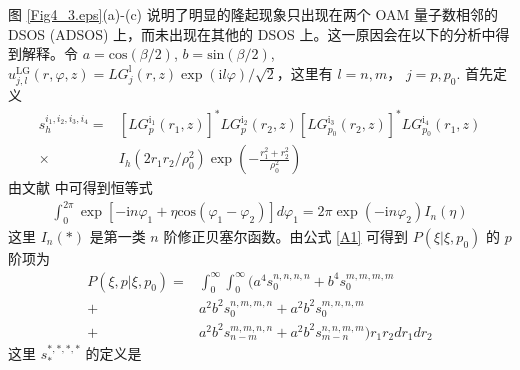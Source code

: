 \documentclass[master]{thesis-uestc}
\begin{document}
图 \ref{Fig4_3.eps}(a)-(c) 说明了明显的隆起现象只出现在两个 OAM 量子数相邻的 DSOS (ADSOS) 上，而未出现在其他的 DSOS 上。这一原因会在以下的分析中得到解释。令 $a=\mathrm{cos}\left(\beta/2\right)$, $b=\mathrm{sin}\left(\beta/2\right)$, $u_{j,l}^\mathrm{LG}(r,\varphi,z)=LG_{j}^\mathrm{l}(r,z)\exp{(\mathrm{i}l\varphi)/\sqrt{2}}$，这里有 $l=n,m$， $j=p,p_0$. 首先定义
\begin{equation}
  \begin{split}
s^{i_{1},i_{2},i_{3},i_{4}}_{h}=&\left[LG_{p}^\mathrm{i_{1}}(r_{1},z)\right]^{\ast}LG_{p}^\mathrm{i_{2}}(r_{2},z)\left[LG_{p_0}^\mathrm{i_{3}}(r_{2},z)\right]^{\ast}LG_{p_0}^\mathrm{i_{4}}(r_{1},z)\\
      \times &I_{h}\left(2r_{1}r_{2}/\rho^2_0\right)\exp\left(-\frac{r_{1}^2+r_{2}^2}{\rho^2_0}\right)
  \label{A3}
 \end{split}
\end{equation}
由文献 \cite{Zhu2015} 中可得到恒等式
\begin{equation}
  \begin{split}
\int_0^{2\pi}\exp{\left[-\mathrm{i}n\varphi_{1}+\eta\mathrm{cos}\left(\varphi_{1}-\varphi_{2}\right)\right]}d\varphi_{1}=2\pi\exp{\left(-\mathrm{i}n\varphi_{2}\right)}I_{n}\left(\eta\right)
 \label{A1}
 \end{split}
\end{equation}
\noindent 这里 $I_{n}(\ast)$ 是第一类 $n$ 阶修正贝塞尔函数。由公式 \eqref{A1} 可得到 $P(\xi|\xi,p_0)$ 的 $p$ 阶项为
\begin{equation}
  \begin{split}
P(\xi,p|\xi,p_0)=&\int_0^{\infty}\int_0^{\infty}(a^{4}s^{n,n,n,n}_{0}+b^{4}s^{m,m,m,m}_{0}\\
                +&a^{2}b^{2}s^{n,m,m,n}_{0}+a^{2}b^{2}s^{m,n,n,m}_{0}\\
+&a^{2}b^{2}s^{m,m,n,n}_{n-m}+a^{2}b^{2}s^{n,n,m,m}_{m-n})r_{1}r_{2}dr_{1}dr_{2}
 \label{A2}
 \end{split}
\end{equation}
\noindent 这里 $s^{\ast,\ast,\ast,\ast}_{\ast}$ 的定义是
\end{document}
